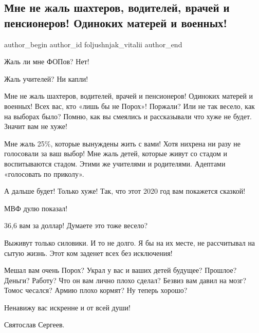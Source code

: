  
 
 
 
 
 
\subsection{Мне не жаль шахтеров, водителей, врачей и пенсионеров! Одиноких матерей и военных!}
\label{sec:24_11_2020.fb.foljushnjak_vitalii.1.mne_ne_zhal}
\ifcmt
	author_begin
   author_id foljushnjak_vitalii
	author_end
\fi

Жаль ли мне ФОПов? Нет!

Жаль учителей? Ни капли!

Мне не жаль шахтеров, водителей, врачей и пенсионеров! Одиноких матерей и
военных! Всех вас, кто «лишь бы не Порох»! Поржали? Или не так весело, как на
выборах было? Помню, как вы смеялись и рассказывали что хуже не будет. Значит
вам не хуже! 

Мне жаль 25\%, которые вынуждены жить с вами! Хотя нихрена ни разу не
голосовали за ваш выбор! Мне жаль детей, которые живут со стадом и
воспитываются стадом. Этими же учителями и родителями. Адептами «голосовать по
приколу».

А дальше будет! Только хуже! Так, что этот 2020 год вам покажется сказкой!

МВФ дулю показал!

36,6 вам за доллар! Думаете это тоже весело?

Выживут только силовики. И то не долго. Я бы на их месте, не рассчитывал на
сытую жизнь. Этот ком заденет всех без исключения!

Мешал вам очень Порох? Украл у вас и ваших детей будущее? Прошлое? Деньги?
Работу? Что он вам лично плохо сделал? Безвиз вам давил на мозг? Томос чесался?
Армию плохо кормят? Ну теперь хорошо?

Ненавижу вас искренне и от всей души!

Святослав Сергеев.
